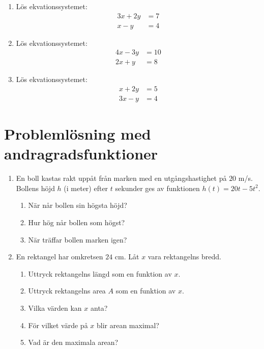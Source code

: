 \documentclass[a4paper,11pt]{article}
\begin{document}
\begin{enumerate}[label=\textbf{\arabic*.}]  
    \item Lös ekvationssystemet:
    \begin{align*}
    3x + 2y &= 7\\
    x - y &= 4
    \end{align*}
    
    \item Lös ekvationssystemet:
    \begin{align*}
    4x - 3y &= 10\\
    2x + y &= 8
    \end{align*}
    
    \item Lös ekvationssystemet:
    \begin{align*}
    x + 2y &= 5\\
    3x - y &= 4
    \end{align*}
\end{enumerate}

\section{Problemlösning med andragradsfunktioner}

\begin{enumerate}[label=\textbf{\arabic*.}]
    \item En boll kastas rakt uppåt från marken med en utgångshastighet på $20$ m/s. Bollens höjd $h$ (i meter) efter $t$ sekunder ges av funktionen $h(t) = 20t - 5t^2$. 
    \begin{enumerate}[label=\alph*)]
        \item När når bollen sin högsta höjd?
        \item Hur hög når bollen som högst?
        \item När träffar bollen marken igen?
    \end{enumerate}
    
    \item En rektangel har omkretsen $24$ cm. Låt $x$ vara rektangelns bredd.
    \begin{enumerate}[label=\alph*)]
        \item Uttryck rektangelns längd som en funktion av $x$.
        \item Uttryck rektangelns area $A$ som en funktion av $x$.
        \item Vilka värden kan $x$ anta?
        \item För vilket värde på $x$ blir arean maximal?
        \item Vad är den maximala arean?
    \end{enumerate}
\end{enumerate}
\end{document}
